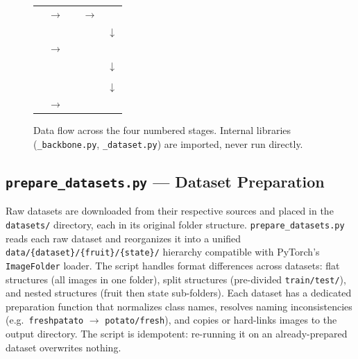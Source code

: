 \documentclass[12pt, a4paper]{article}
\begin{document}
\begin{figure}[h]
\centering
\begin{tabular}{ccccc}
 & $\longrightarrow$ &
 & $\longrightarrow$ &
 \\[6pt]
& & & & $\downarrow$ \\[6pt]
 & $\longrightarrow$ &
 \\[6pt]
& & & & $\downarrow$ \\[6pt]
& &  \\[6pt]
& & & & $\downarrow$ \\[6pt]
 & $\longrightarrow$ &
\end{tabular}
\caption{Data flow across the four numbered stages.
Internal libraries (\texttt{\_backbone.py}, \texttt{\_dataset.py}) are imported,
never run directly.}
\label{fig:pipeline}
\end{figure}

\subsection{\texttt{prepare\_datasets.py} --- Dataset Preparation}

Raw datasets are downloaded from their respective sources and placed in the
\texttt{datasets/} directory, each in its original folder structure.
\texttt{prepare\_datasets.py} reads each raw dataset and reorganizes it into
a unified \texttt{data/\{dataset\}/\{fruit\}/\{state\}/} hierarchy compatible
with PyTorch's \texttt{ImageFolder} loader.
The script handles format differences across datasets:
flat structures (all images in one folder), split structures (pre-divided
\texttt{train/test/}), and nested structures (fruit then state sub-folders).
Each dataset has a dedicated preparation function that normalizes class names,
resolves naming inconsistencies (e.g.\ \texttt{freshpatato}
$\to$ \texttt{potato/fresh}), and copies or hard-links images to the output
directory.
The script is idempotent: re-running it on an already-prepared dataset
overwrites nothing.
\end{document}
